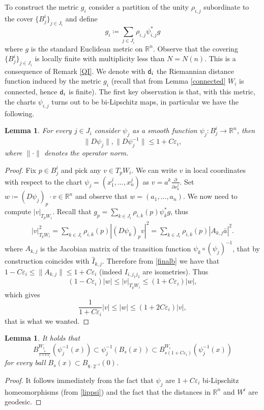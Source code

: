 \documentclass[11pt]{article}
\newcommand{\eps}{\varepsilon}
\newcommand{\rr}{\mathbb{R}}
\newcommand{\sfd}{{\sf d}}
\theoremstyle{plain}
\newtheorem{lemma}[theorem]{Lemma}
\theoremstyle{definition}
\numberwithin{equation}{section}
\begin{document}
To construct the metric $g_i$ consider a partition of the unity $\rho_{i,j}$ subordinate to the cover $\{B^i_j\}_{j\in J_i}$ and define
\[ g_i\coloneqq  \sum_{j \in J_i}  \rho_{i,j}\psi_{i,j}^*g   \] 
where $g$ is the standard Euclidean metric on $\rr^n.$ Observe that the covering $\{B^i_j\}_{j\in J_i}$ is locally finite with multiplicity less than $N=N(n)$. This is a consequence of Remark \ref{QI}. We denote with $\sfd_i$ the Riemannian distance function induced by the metric $g_i$ (recall that from Lemma \ref{connected} $W_i$ is connected, hence $\sfd_i$ is finite).
The first key observation is  that, with this metric, the charts $\psi_{i,j}$ turns out to be bi-Lipschitz maps, in particular we have the following.
\begin{lemma}\label{lippsii}
	For every $j\in J_i$ consider $\psi_{j}$ as a smooth function $\psi_{j}: B_j^i\to \rr^n$, then
	\begin{equation}\label{lippsi}
		\|D\psi_{j}\|, \|D\psi_{j}^{-1}\|\le 1+C\eps_i,
	\end{equation}
	where $\|\cdot \|$ denotes the operator norm.
\end{lemma}
\begin{proof}
	Fix $p \in B^i_j$ and pick any $v \in T_p W_i.$ We can write $v$ in local coordinates with respect to the chart $\psi_{j}=(x_1^j,...,x_n^j)$ as $v=a^k\frac{\partial}{\partial x^j_k}.$ Set $ w\coloneqq  (D\psi_{j})_p\cdot v \in \rr^n$ and observe that $w=(a_1,...,a_n).$ We now need to compute $|v|_{T_pW_i}.$ Recall that $g_p= \sum_{k\in J_i} \rho_{i,k}(p) \psi_{k}^*g$, thus 
	\begin{align*}
		|v|^2_{T_pW_i}=\sum_{k\in J_i} \rho_{i,k}(p) |(D\psi_{k})_pv|^2=\sum_{k\in J_i} \rho_{i,k}(p) |A_{k,j}\bar a|^2.
	\end{align*}
	where $A_{k,j}$ is the Jacobian matrix of the transition function $\psi_k \circ (\psi_j)^{-1}$, that by construction coincides with $\hat I_{k,j}.$ Therefore from \eqref{finalb} we have that $ 1-C\eps_i\le \|A_{k,j}\|\le 1+C\eps_i$ (indeed  $I_{i,j_1j_2}$ are isometries). Thus
	\begin{equation*}
		(1 -C\eps_i) |w|\le|v|_{T_pW_i}\le (1 + C\eps_i) |w|,
	\end{equation*}
	which gives 
	\[\frac{1}{1+C\eps_i}  |v|\le|w|\le (1 + 2C\eps_i) |v|,\]
	that is what we wanted.
\end{proof}


\begin{lemma}\label{ballsinballs}
    It  holds that
	$$B^{W_i}_{\frac{s}{1+C\eps_i}}(\psi_{j}^{-1}(x))\subset \psi_{j}^{-1}(B_{s}(x))\subset B^{W_i}_{s(1+C\eps_i)}(\psi_{j}^{-1}(x))$$
	for every ball $B_s(x)\subset B_{8\cdot 2^{-i}}(0)$.
\end{lemma}
\begin{proof}
     It follows  immediately from the fact that $\psi_{j}$ are $1+C\eps_i$ bi-Lipschitz homeomorphisms (from \eqref{lippsi}) and the fact that the distances in $\rr^n$ and $W^i$ are geodesic.
\end{proof}
\end{document}
